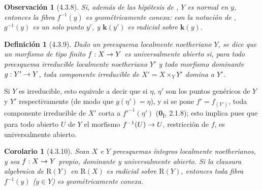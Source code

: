 \documentclass[10pt,oneside,openany]{book}
\theoremstyle{egaenv}\newtheorem*{env}{---}
\theoremstyle{egastatement}
\newtheorem*{corollary}{Corolario}
\theoremstyle{egadescription}
\newtheorem*{definition}{Definición}
\newtheorem*{remark}{Observación}
\renewcommand{\to}{\mathchoice{\longrightarrow}{\rightarrow}{\rightarrow}{\rightarrow}}
\begin{document}
\begin{remark}[4.3.8]
\label{III.4.3.8}
\label{III.4.3.8-fr}
Si, además de las hipótesis de , $Y$ es normal en
$y$, entonces la fibra $f^{-1}(y)$ es geométricamente conexa: con la
notación de , $g^{-1}(y)$ es un solo punto $y'$, y
$\boldsymbol{k}(y')$ es radicial sobre $\boldsymbol{k}(y)$.
\end{remark}

\begin{definition}[4.3.9]
\label{III.4.3.9-fr}
Dado un preesquema localmente noetheriano $Y$, se dice que un morfismo \textup{de
tipo finito} $f:X\to Y$ es universalmente abierto si, para todo
preesquema irreducible localmente noetheriano $Y'$ y todo morfismo dominante
$g:Y'\to Y$, toda componente irreducible de $X'=X\times_YY'$ domina a $Y'$.
\end{definition}

Si $Y$ es irreducible, esto equivale a decir que si $\eta$, $\eta'$ son los
puntos genéricos de $Y$ y $Y'$ respectivamente (de modo que
$g(\eta')=\eta$), y si se pone $f'=f_{(Y')}$, toda componente irreducible
de $X'$ corta a $f'^{-1}(\eta')$ (\textbf{0}\textsubscript{I}, 2.1.8); esto
implica pues que para todo abierto $U$ de $Y$ el morfismo
$f^{-1}(U)\to U$, restricción de $f$, es universalmente abierto.

\begin{corollary}[4.3.10]
\label{III.4.3.10}
\label{III.4.3.10-fr}
Sean $X$ e $Y$ preesquemas íntegros localmente noetherianos, y sea
$f:X\to Y$ propio, dominante y universalmente abierto. Si la clausura
algebraica de $\mathrm R(Y)$ en $\mathrm R(X)$ es radicial sobre
$\mathrm R(Y)$, entonces toda fibra $f^{-1}(y)$ ($y\in Y$) es geométricamente conexa.
\end{corollary}
\end{document}

